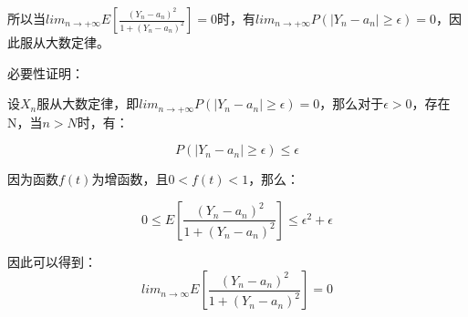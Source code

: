 \documentclass{article}
\begin{document}
所以当$lim_{n\rightarrow+\infty}E[\frac{(Y_n-a_n)^2}{1+(Y_n-a_n)^2}]=0$时，有$lim_{n\rightarrow+\infty}P(|Y_n-a_n|\geq\epsilon)=0$，因此服从大数定律。

必要性证明：

设${X_n}$服从大数定律，即$lim_{n\rightarrow+\infty}P(|Y_n-a_n|\geq\epsilon)=0$，那么对于$\epsilon > 0$，存在N，当$n>N$时，有：

$$P(|Y_n-a_n|\geq\epsilon)\leq\epsilon$$

因为函数$f(t)$为增函数，且$0<f(t)<1$，那么：

$$0\leq E[\frac{(Y_n-a_n)^2}{1+(Y_n-a_n)^2}]\leq\epsilon^2+\epsilon$$

因此可以得到：
$$lim_{n\rightarrow \infty}E[\frac{(Y_n-a_n)^2}{1+(Y_n-a_n)^2}]=0$$
\end{document}
